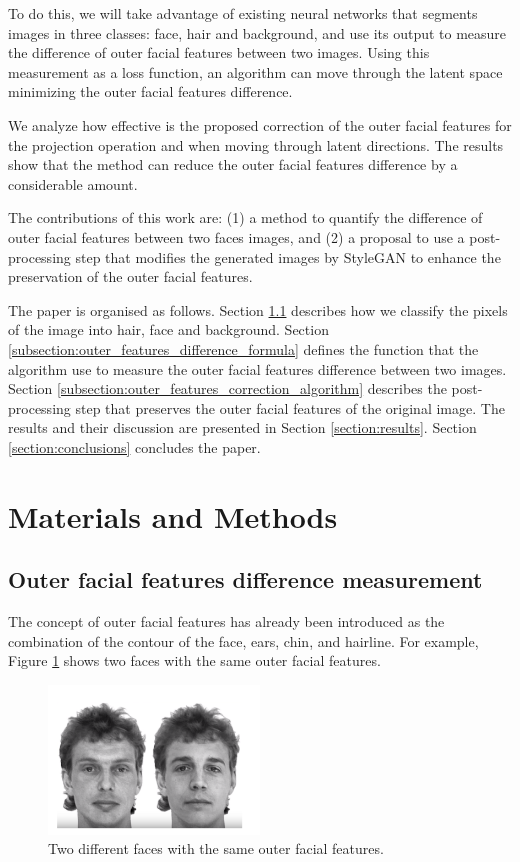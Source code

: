 \documentclass[review]{elsarticle}
\begin{document}
To do this, we will take advantage of existing neural networks that segments images in three classes: face, hair and background, and use its output to measure the difference of outer facial features between two images. Using this measurement as a loss function, an algorithm can move through the latent space minimizing the outer facial features difference.

We analyze how effective is the proposed correction of the outer facial features for the projection operation and when moving through latent directions. The results show that the method can reduce the outer facial features difference by a considerable amount.

The contributions of this work are: (1) a method to quantify the difference of outer facial features between two faces images, and (2) a proposal to use a post-processing step that modifies the generated images by StyleGAN to enhance the preservation of the outer facial features.

The paper is organised as follows. Section \ref{subsection:outer_features_difference_measurement} describes how we classify the pixels of the image into hair, face and background. Section \ref{subsection:outer_features_difference_formula} defines the function that the algorithm use to measure the outer facial features difference between two images. Section \ref{subsection:outer_features_correction_algorithm} describes the post-processing step that preserves the outer facial features of the original image. The results and their discussion are presented in Section \ref{section:results}. Section \ref{section:conclusions} concludes the paper.

\section{Materials and Methods}\label{section:materials_and_methods}
\subsection{Outer facial features difference measurement}\label{subsection:outer_features_difference_measurement}

The concept of outer facial features has already been introduced as the combination of the contour of the face, ears, chin, and hairline. For example, Figure \ref{fig:outer_facial_features} shows two faces with the same outer facial features.

\begin{figure}[H]
  \includegraphics[width=0.5\textwidth, center]{Images/face_frame.png}
  \caption{Two different faces with the same outer facial features.}
  \label{fig:outer_facial_features}
\end{figure}
\end{document}
